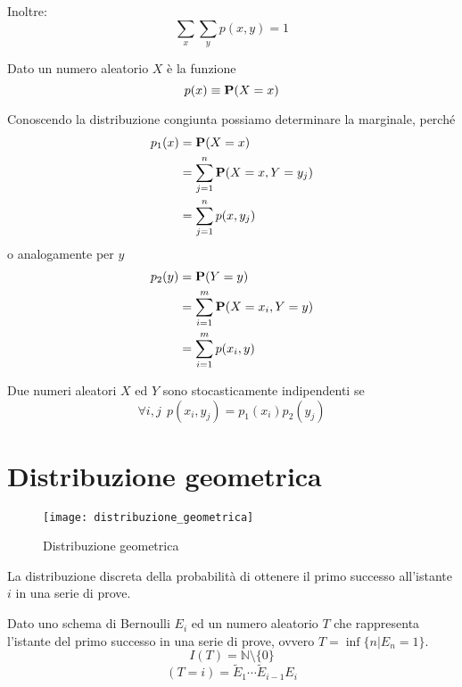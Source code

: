 Inoltre:
\[
  \sum_x \sum_y p(x,y) = 1
\]

\begin{definition}
  \label{def:distribuzione_marginale}
  Dato un numero aleatorio \( X \) è la funzione
  \[
    p(x) \equiv \mathbf{P}(X = x)
  \]

  Conoscendo la distribuzione congiunta possiamo determinare la marginale, perché
  \begin{align*}
    p_1(x) &= \mathbf{P}(X = x) \\
    &= \sum_{j = 1}^n \mathbf{P}(X = x, Y = y_j) \\
    &= \sum_{j = 1}^n p(x, y_j)
  \end{align*}
  o analogamente per \( y \)
  \begin{align*}
    p_2(y) &= \mathbf{P}(Y = y) \\
    &= \sum_{i = 1}^m \mathbf{P}(X = x_i, Y = y) \\
    &= \sum_{i = 1}^m p(x_i, y)
  \end{align*}
\end{definition}

\begin{definition}
  Due numeri aleatori \( X \) ed \( Y \) sono stocasticamente indipendenti se
  \[
    \forall i,j ~~ p(x_i, y_j) = p_1(x_i) p_2(y_j)
  \]
\end{definition}


\section{Distribuzione geometrica} %
\begin{figure*}
  \texttt{[image: distribuzione\_geometrica]}
  \caption{Distribuzione geometrica} 
\end{figure*}

\begin{definition}\label{def:distribuzione_geometrica}
  La distribuzione discreta della probabilità di ottenere il primo successo all'istante $i$ in una serie di prove.
\end{definition}

Dato uno schema di Bernoulli \( E_i \) ed un numero aleatorio \( T \) che rappresenta l'istante del primo successo in una serie di prove, ovvero \( T = \inf\{ n | E_n = 1 \} \).
\[
  I(T) = \mathbb{N} \setminus \{ 0 \}
\]
\[
  (T = i) = \tilde{E}_1 \cdots \tilde{E}_{i-1} E_i
\]


